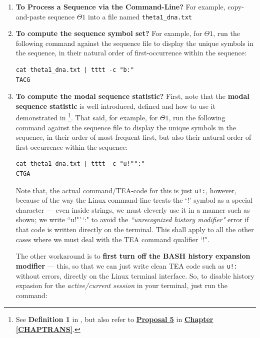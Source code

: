 \documentclass[a4paper, 18pt]{book} %
\begin{document}
\begin{enumerate}
\item {\textbf{To Process a Sequence via the Command-Line?} For example, copy-and-paste sequence $\Theta1$ into a file named \texttt{theta1\_dna.txt}}
\item {\textbf{To compute the sequence symbol set?} For example, for $\Theta1$, run the following command against the sequence file to display the unique symbols in the sequence, in their natural order of first-occurrence within the sequence:

\vspace{1em}
\begin{verbatim}
cat theta1_dna.txt | tttt -c "b:"
TACG
\end{verbatim}
\vspace{1em}

}
\item {\textbf{To compute the modal sequence statistic?} First, note that the \textbf{modal sequence statistic} is well introduced, defined and how to use it demonstrated in \cite{transformatics}\footnote{See \textbf{Definition 1} in \cite{transformatics}, but also refer to \textbf{\hyperref[PROP5]{Proposal 5}} in \textbf{\hyperref[CHAPTRANS]{Chapter \ref{CHAPTRANS}}}.}. That said, for example, for $\Theta1$, run the following command against the sequence file to display the unique symbols in the sequence, in their order of most frequent first, but also their natural order of first-occurrence within the sequence:

\vspace{1em}
\begin{verbatim}
cat theta1_dna.txt | tttt -c "u!"":"
CTGA
\end{verbatim}
\vspace{1em}

Note that, the actual command/TEA-code for this is just \texttt{u!:}, however, because of the way the Linux command-line treats the `!' symbol as a special character --- even inside strings, we must cleverly use it in a manner such as shown; we write ``u!"``:" to avoid the \textit{``unrecognized history modifier"} error if that code is written directly on the terminal. This shall apply to all the other cases where we must deal with the TEA command qualifier `!"\cite{Lutalo2024_taz}.

The other workaround is to \textbf{first turn off the BASH history expansion modifier} --- this, so that we can just write clean TEA code such as \texttt{u!:} without errors, directly on the Linux terminal interface. So, to disable history expasion for the \textit{active/current session} in your terminal, just run the command:

}
\end{enumerate}
\end{document}
